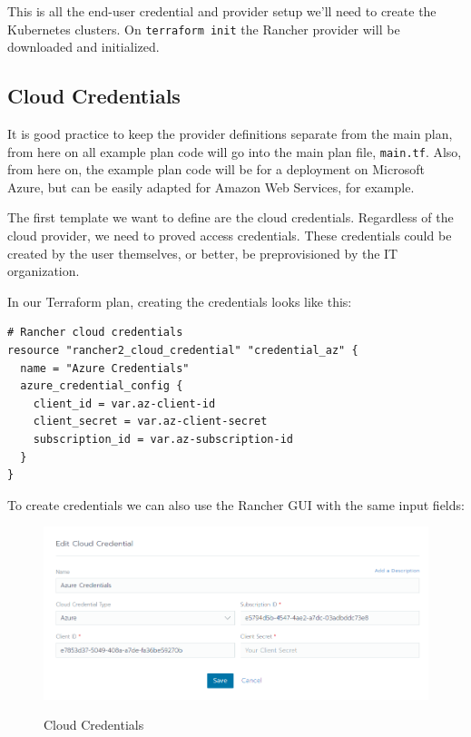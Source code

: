 This is all the end-user credential and provider setup we'll need to create the Kubernetes clusters. On \verb|terraform init| the Rancher provider will be downloaded and initialized. 

\subsection{Cloud Credentials}

It is good practice to keep the provider definitions separate from the main plan, from here on all example plan code will go into the main plan file, \verb|main.tf|. Also, from here on, the example plan code will be for a deployment on Microsoft Azure, but can be easily adapted for Amazon Web Services, for example.

The first template we want to define are the cloud credentials. Regardless of the cloud provider, we need to proved access credentials. These credentials could be created by the user themselves, or better, be preprovisioned by the IT organization.

In our Terraform plan, creating the credentials looks like this:

\begin{lstlisting}[caption=Cloud Credentials, frame=single, basicstyle=\ttfamily]
# Rancher cloud credentials
resource "rancher2_cloud_credential" "credential_az" {
  name = "Azure Credentials"
  azure_credential_config {
    client_id = var.az-client-id
    client_secret = var.az-client-secret
    subscription_id = var.az-subscription-id
  }
}
\end{lstlisting}

To create credentials we can also use the Rancher GUI with the same input fields:

\begin{figure}[H]
\centering
\caption {Cloud Credentials}
\includegraphics[width=\linewidth]{images/cloud-credentials.png}
\label{fig:cloudCredentials}
\end{figure}

